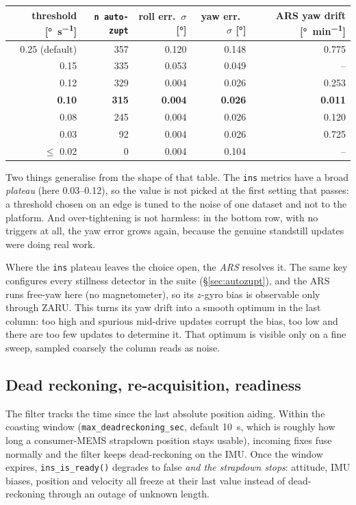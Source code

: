 \documentclass[11pt,a4paper]{article}
\newcommand{\code}[1]{\texttt{#1}}
\begin{document}
\begin{center}
\begin{tabular}{rrrrr}
\toprule
threshold [\si{\degree\per\second}] & \code{n auto-zupt} &
roll err.\ $\sigma$ [\si{\degree}] & yaw err.\ $\sigma$ [\si{\degree}] &
ARS yaw drift [\si{\degree\per\minute}] \\
\midrule
0.25 (default) & 357 & 0.120 & 0.148 & 0.775 \\
0.15           & 335 & 0.053 & 0.049 & --    \\
0.12           & 329 & 0.004 & 0.026 & 0.253 \\
\textbf{0.10}  & \textbf{315} & \textbf{0.004} & \textbf{0.026} & \textbf{0.011} \\
0.08           & 245 & 0.004 & 0.026 & 0.120 \\
0.03           &  92 & 0.004 & 0.026 & 0.725 \\
$\le$ 0.02     &   0 & 0.004 & 0.104 & --    \\
\bottomrule
\end{tabular}
\end{center}

Two things generalise from the shape of that table. The \code{ins} metrics have
a broad \emph{plateau} (here \numrange{0.03}{0.12}), so the value is not picked
at the first setting that passes: a threshold chosen on an edge is tuned to
the noise of one dataset and not to the platform. And over-tightening is not
harmless: in the bottom row, with no triggers at all, the yaw error grows again,
because the genuine standstill updates were doing real work.

Where the \code{ins} plateau leaves the choice open, the \emph{ARS} resolves it.
The same key configures every stillness detector in the suite
(\S\ref{sec:autozupt}), and the ARS runs free-yaw here (no magnetometer), so its
$z$-gyro bias is observable only through ZARU. This turns its yaw drift into
a smooth optimum in the last column: too high and spurious mid-drive updates
corrupt the bias, too low and there are too few updates to determine it. That
optimum is visible only on a fine sweep, sampled coarsely the column reads as
noise.

\subsection{Dead reckoning, re-acquisition, readiness}
\label{sec:readiness}

The filter tracks the time since the last absolute position aiding.
Within the coasting window (\code{max\_\allowbreak{}deadreckoning\_\allowbreak{}sec}, default
\SI{10}{\second}, which is roughly how long a consumer-MEMS strapdown position
stays usable), incoming fixes fuse normally and the filter keeps
dead-reckoning on the IMU. Once the window expires,
\code{ins\_\allowbreak{}is\_\allowbreak{}ready()} degrades to false \emph{and the strapdown
stops}: attitude, IMU biases, position and velocity all freeze at their
last value instead of dead-reckoning through an outage of unknown
length.
\end{document}
